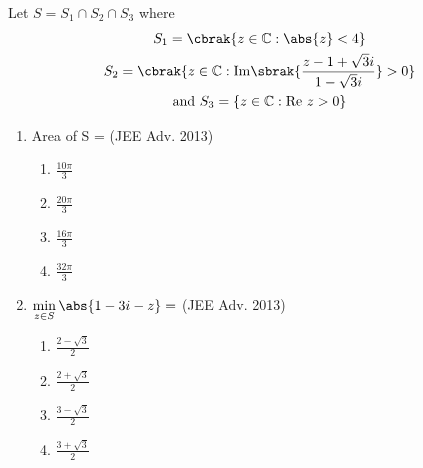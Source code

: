 \iffalse
\title{Assignment 1}
\author{AI24BTECH11031 - Shivram S}
\section{paragraph}
\fi

\setcounter{enumi}{1}
\item Let $S = S_1 \cap S_2 \cap S_3$ where
\begin{gather*}
	S_1 = \cbrak{z \in \mathbb C: \abs{z} < 4 } \\
	S_2 = \cbrak{z \in \mathbb C: \mathrm{Im} \sbrak{ \frac {z - 1 + \sqrt 3 i} {1 - \sqrt 3 i} } > 0 } \\
	\text{and} \ S_3 = \{z \in \mathbb C: \mathrm{Re}\ z > 0\}
\end{gather*}

\begin{enumerate}
	\item Area of S = 
		\hfill (JEE Adv. 2013)

		\begin{multicols}{4}
			\begin{enumerate}
				\item $\frac {10\pi} {3}$ 
				\item $\frac {20\pi} {3}$
				\item $\frac {16\pi} {3}$
				\item $\frac {32\pi} {3}$
			\end{enumerate}
		\end{multicols}

	\item $\min\limits_{z \in S} \abs{1 - 3i - z} = $
		\hfill (JEE Adv. 2013)

		\begin{multicols}{2}
			\begin{enumerate}
				\item $\frac {2 - \sqrt{3}} {2}$
				\item $\frac {2 + \sqrt{3}} {2}$
				\item $\frac {3 -\sqrt{3}} {2}$
				\item $\frac {3 + \sqrt{3}} {2}$
			\end{enumerate}
		\end{multicols}
\end{enumerate}

